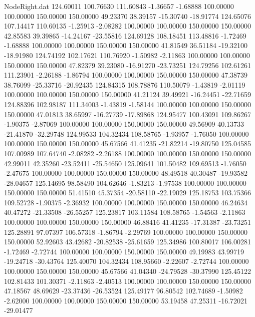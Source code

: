 \begin{filecontents}{NodeRight.dat}
 124.60011  100.76630  111.60843    -1.36657   -1.68888  100.00000  100.00000  150.00000  150.00000   49.23370   38.39157  -15.30740  -18.91774
 124.65076  107.14417  110.60135    -1.25913   -2.08282  100.00000  100.00000  150.00000  150.00000   42.85583   39.39865  -14.24167  -23.55816
 124.69128  108.18451  113.48816    -1.72469   -1.68888  100.00000  100.00000  150.00000  150.00000   41.81549   36.51184  -19.32100  -18.91980
 124.74192  102.17621  110.76920    -1.50982   -2.11863  100.00000  100.00000  150.00000  150.00000   47.82379   39.23080  -16.91270  -23.73251
 124.79256  102.61261  111.23901    -2.26188   -1.86794  100.00000  100.00000  150.00000  150.00000   47.38739   38.76099  -25.33716  -20.92435
 124.84315  108.78876  110.50079    -1.43819   -2.01119  100.00000  100.00000  150.00000  150.00000   41.21124   39.49921  -16.24451  -22.71659
 124.88396  102.98187  111.34003    -1.43819   -1.58144  100.00000  100.00000  150.00000  150.00000   47.01813   38.65997  -16.27739  -17.89868
 124.95477  100.43091  109.86267    -1.90375   -2.87069  100.00000  100.00000  150.00000  150.00000   49.56909   40.13733  -21.41870  -32.29748
 124.99533  104.32434  108.58765    -1.93957   -1.76050  100.00000  100.00000  150.00000  150.00000   45.67566   41.41235  -21.82214  -19.80750
 125.04585  107.00989  107.64740    -2.08282   -2.26188  100.00000  100.00000  150.00000  150.00000   42.99011   42.35260  -23.52411  -25.54650
 125.09641  101.50482  109.69513    -1.76050   -2.47675  100.00000  100.00000  150.00000  150.00000   48.49518   40.30487  -19.93582  -28.04657
 125.14695   98.58490  104.62646    -1.83213   -1.97538  100.00000  100.00000  150.00000  150.00000   51.41510   45.37354  -20.58110  -22.19029
 125.18753  103.75366  109.52728    -1.90375   -2.36932  100.00000  100.00000  150.00000  150.00000   46.24634   40.47272  -21.33508  -26.55257
 125.23817  103.11584  108.58765    -1.54563   -2.11863  100.00000  100.00000  150.00000  150.00000   46.88416   41.41235  -17.31387  -23.73251
 125.28891   97.07397  106.57318    -1.86794   -2.29769  100.00000  100.00000  150.00000  150.00000   52.92603   43.42682  -20.82538  -25.61659
 125.34986  100.80017  106.00281    -1.72469   -2.72744  100.00000  100.00000  150.00000  150.00000   49.19983   43.99719  -19.24718  -30.43764
 125.40070  104.32434  108.95660    -2.22607   -2.72744  100.00000  100.00000  150.00000  150.00000   45.67566   41.04340  -24.79528  -30.37990
 125.45122  102.81433  101.30371    -2.11863   -2.40513  100.00000  100.00000  150.00000  150.00000   47.18567   48.69629  -23.37436  -26.53524
 125.49177   96.80542  102.74689    -1.50982   -2.62000  100.00000  100.00000  150.00000  150.00000   53.19458   47.25311  -16.72021  -29.01477

\end{filecontents}
